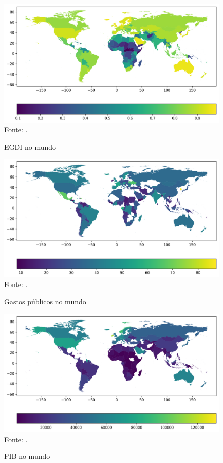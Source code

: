 \begin{figure}[H]
	\centering
	\caption{EGDI no mundo}
	\includegraphics[width=1\linewidth]{figuras/egdi/mapa_coropleto_paises_egdi}
	\label{fig:mapa_coropleto_paises_egdi}
	\footnotesize{Fonte: \cite{ONU_EGDI_mapa}.}
\end{figure}

\begin{figure}[H]
	\centering
	\caption{Gastos públicos no mundo}
	\includegraphics[width=1\linewidth]{figuras/government_spending/mapa_coropleto_paises_gastospublicos}
	\label{fig:mapa_coropleto_paises_gastospublicos}
	\footnotesize{Fonte: \cite{FMI_gov_expenditure}.}
\end{figure}

\begin{figure}[H]
	\centering
	\caption{PIB no mundo}
	\includegraphics[width=1\linewidth]{figuras/pib/mapa_coropleto_paises_pib_percapita_ppc}
	\label{fig:mapa_coropleto_paises_pib_percapita_ppc}
	\footnotesize{Fonte: \cite{WB_pib_per_capita_países}.}
\end{figure}



